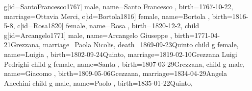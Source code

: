 \documentclass{article}
\begin{document}
\begin{midpage}
\begin{center}
\begin{genealogypicture}
{{{{{{{                            g[id=SantoFrancesco1767]{
                                male,
                                name={Santo Francesco },
                                birth={1767-10-22}{},
                                marriage={Ottavia Merci}{},
                            }
                            c[id=Bortola1816]{
                                female,
                                name={Bortola },
                                birth={1816-5-8}{},
                            }
                            c[id=Rosa1820]{
                                female,
                                name={Rosa },
                                birth={1820-12-2}{},
                            }
                        }
                        child{
                            g[id=Arcangelo1771]{
                                male,
                                name={Arcangelo Giuseppe },
                                birth={1771-04-21}{Grezzana},
                                marriage={Paola Nicolis}{},
                                death={1869-09-23}{Quinto}
                            }
                            child{
                                g{
                                    female,
                                    name={Luigia },
                                    birth={1802-09-24}{Quinto},
                                    marriage={1819-02-10}{Grezzana \newline Luigi Pedrighi}
                                }
                            }
                            child{
                                g{
                                    female,
                                    name={Santa },
                                    birth={1807-03-29}{Grezzana},
                                }
                            }
                            child{
                                g{
                                    male,
                                    name={Giacomo },
                                    birth={1809-05-06}{Grezzana},
                                    marriage={1834-04-29}{Angela Anechini}
                                }
                                child{
                                    g{
                                        male,
                                        name={Paolo },
                                        birth={1835-01-22}{Quinto},
                                    }
}}}}}}}}}
\end{genealogypicture}
\end{center}
\end{midpage}
\end{document}
